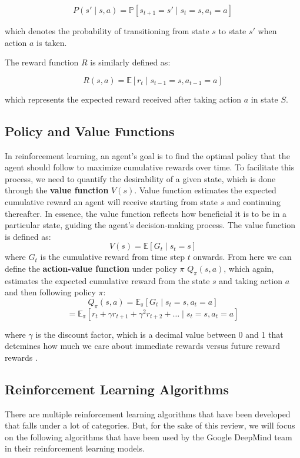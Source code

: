 \[
    P(s'\mid s, a) = \mathbb{P}[s_{t+1} = s' \mid s_t = s, a_t = a]
\]

which denotes the probability of transitioning from state $s$ to state $s'$
when action $a$ is taken.

The reward function \( R \) is similarly defined as:

\[
    R(s, a) = \mathbb{E}[r_t \mid s_{t-1} = s, a_{t-1} = a]
\]

which represents the expected reward received after taking action $a$ in state
$S$.
\subsection{Policy and Value Functions}
In reinforcement learning, an agent's goal is to find the optimal policy that
the agent should follow to maximize cumulative rewards over time. To facilitate
this process, we need to quantify the desirability of a given state, which is
done through the \textbf{value function} $V(s)$. Value function estimates the
expected cumulative reward an agent will receive starting from state \( s \)
and continuing thereafter. In essence, the value function reflects how
beneficial it is to be in a particular state, guiding the agent's
decision-making process. The value function is defined as:
\[
    V(s) = \mathbb{E}[G_t \mid s_t = s]
\]
where \( G_t \) is the cumulative reward from time step $t$ onwards. From here
we can define the \textbf{action-value function} under policy $\pi$ $Q_\pi(s,
    a)$, which again, estimates the expected cumulative reward from the state $s$
and taking action $a$ and then following policy $\pi$:
\[
    Q_\pi(s, a) = \mathbb{E_\pi}[G_t \mid s_t = s, a_t = a]
\]
\[
    = \mathbb{E_\pi}[r_t + \gamma r_{t+1} + \gamma^2 r_{t+2} + \ldots \mid s_t = s, a_t = a]
\]

where $\gamma$ is the discount factor, which is a decimal value between 0 and 1
that detemines how much we care about immediate rewards versus future reward
rewards \cite{bg2}.\\

\subsection{Reinforcement Learning Algorithms}
There are multiple reinforcement learning algorithms that have been developed
that falls under a lot of categories. But, for the sake of this review, we will
focus on the following algorithms that have been used by the Google DeepMind
team in their reinforcement learning models.\\

